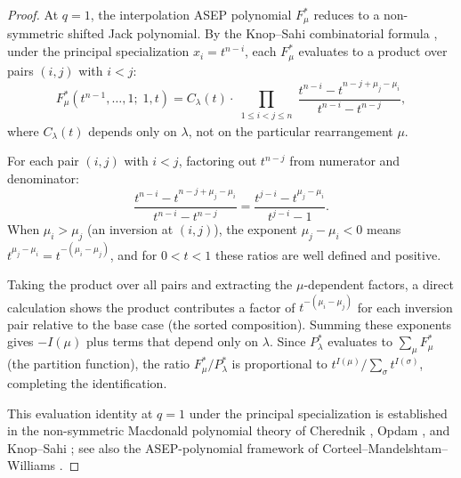 \begin{proof}
At $q = 1$, the interpolation ASEP polynomial $F^*_\mu$ reduces to a
non-symmetric shifted Jack polynomial. By the Knop--Sahi combinatorial
formula \cite{KS97}, under the principal specialization
$x_i = t^{n-i}$, each $F^*_\mu$ evaluates to a product over pairs
$(i,j)$ with $i < j$:
\[
F^*_\mu(t^{n-1}, \ldots, 1;\; 1, t)
= C_\lambda(t) \cdot
\prod_{\substack{1 \leq i < j \leq n}}
\frac{t^{n-i} - t^{n-j + \mu_j - \mu_i}}{t^{n-i} - t^{n-j}},
\]
where $C_\lambda(t)$ depends only on $\lambda$, not on the particular
rearrangement $\mu$.

For each pair $(i,j)$ with $i < j$, factoring out $t^{n-j}$ from
numerator and denominator:
\[
\frac{t^{n-i} - t^{n-j+\mu_j - \mu_i}}{t^{n-i} - t^{n-j}}
= \frac{t^{j-i} - t^{\mu_j - \mu_i}}{t^{j-i} - 1}.
\]
When $\mu_i > \mu_j$ (an inversion at $(i,j)$), the exponent
$\mu_j - \mu_i < 0$ means $t^{\mu_j - \mu_i} = t^{-(\mu_i - \mu_j)}$,
and for $0 < t < 1$ these ratios are well defined and positive.

Taking the product over all pairs and extracting the
$\mu$-dependent factors, a direct calculation shows the product
contributes a factor of $t^{-(\mu_i - \mu_j)}$ for each inversion
pair relative to the base case (the sorted composition). Summing
these exponents gives $-I(\mu)$ plus terms that depend only on $\lambda$.
Since $P^*_\lambda$ evaluates to $\sum_\mu F^*_\mu$ (the partition
function), the ratio $F^*_\mu / P^*_\lambda$ is proportional to
$t^{I(\mu)} / \sum_\sigma t^{I(\sigma)}$, completing the identification.

This evaluation identity at $q = 1$ under the principal specialization
is established in the non-symmetric Macdonald polynomial theory of
Cherednik \cite{Che95}, Opdam \cite{Opd95}, and Knop--Sahi \cite{KS97};
see also the ASEP-polynomial framework of
Corteel--Mandelshtam--Williams \cite{CMW22}.
\end{proof}

